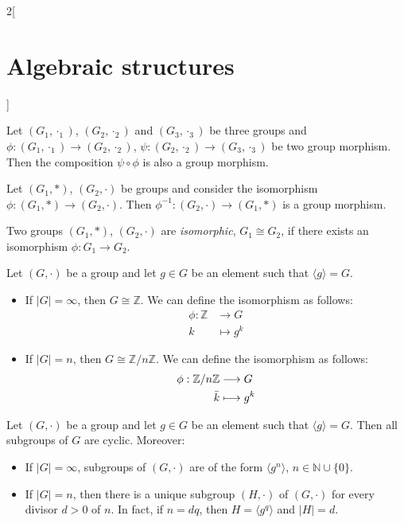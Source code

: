 \documentclass[class=article,10pt,crop=false]{standalone}
\begin{document}
\begin{multicols}{2}[\section{Algebraic structures}]
\begin{prop}
Let $(G_1,\cdot_1)$, $(G_2,\cdot_2)$ and $(G_3,\cdot_3)$ be three groups and $\phi:(G_1,\cdot_1)\rightarrow(G_2,\cdot_2)$, $\psi:(G_2,\cdot_2)\rightarrow(G_3,\cdot_3)$ be two group morphism. Then the composition $\psi\circ\phi$ is also a group morphism.
\end{prop}
\begin{prop}
Let $(G_1,*)$, $(G_2,\cdot)$ be groups and consider the isomorphism $\phi:(G_1,*)\rightarrow(G_2,\cdot)$. Then $\phi^{-1}:(G_2,\cdot)\rightarrow(G_1,*)$ is a group morphism.
\end{prop}
\begin{definition}
Two groups $(G_1,*)$, $(G_2,\cdot)$ are \textit{isomorphic}, $G_1\cong G_2$, if there exists an isomorphism $\phi:G_1\rightarrow G_2$.
\end{definition}
\begin{theorem}
Let $(G,\cdot)$ be a group and let $g\in G$ be an element such that $\langle g\rangle=G$.
\begin{itemize}
    \item If $|G|=\infty$, then $G\cong\mathbb{Z}$. We can define the isomorphism as follows: 
    \begin{align*}
        \phi:\mathbb{Z}&\longrightarrow G\\
        k&\longmapsto g^k
    \end{align*}
    \item If $|G|=n$, then $G\cong\mathbb{Z}/n\mathbb{Z}$. We can define the isomorphism as follows: 
    \begin{align*}
        \phi:\mathbb{Z}/n\mathbb{Z}&\longrightarrow G\\
        \Bar{k}&\longmapsto g^k
    \end{align*}
\end{itemize}
\end{theorem}
\begin{corollary}
Let $(G,\cdot)$ be a group and let $g\in G$ be an element such that $\langle g\rangle=G$. Then all subgroups of $G$ are cyclic. Moreover:
\begin{itemize}
    \item If $|G|=\infty$, subgroups of $(G,\cdot)$ are of the form $\langle g^n\rangle$, $n\in\mathbb{N}\cup\{0\}$. 
    \item If $|G|=n$, then there is a unique subgroup $(H,\cdot)$ of $(G,\cdot)$ for every divisor $d>0$ of $n$. In fact, if $n=dq$, then $H=\langle g^q\rangle$ and $|H|=d$.

\end{itemize}
\end{corollary}
\end{multicols}
\end{document}
